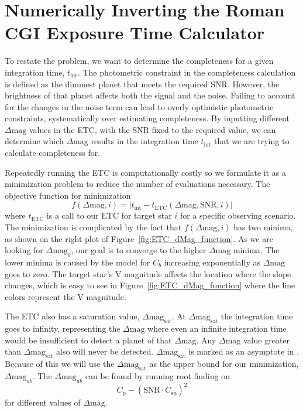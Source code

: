 \section{Numerically Inverting the Roman CGI Exposure Time Calculator}
\label{sec:numerically_inverting_ETC}

To restate the problem, we want to determine the completeness for a given
integration time, $t_{\textrm{int}}$. The photometric constraint in the
completeness calculation is defined as the dimmest planet that meets the
required SNR. However, the brightness of that planet affects both the signal
and the noise. Failing to account for the changes in the noise term can lead to
overly optimistic photometric constraints, systematically over estimating
completeness. By inputting different $\Delta\textrm{mag}$ values in the
ETC, with the SNR fixed to the required value, we can
determine which $\Delta\textrm{mag}$ results in the integration time
$t_{\textrm{int}}$ that we are trying to calculate completeness for.

Repeatedly running the ETC is computationally costly so we formulate it as a
minimization problem to reduce the number of evaluations necessary. The
objective function for minimization
\begin{equation}
  f(\Delta\textrm{mag}, i) = |t_{\textrm{int}} -
  t_{\textrm{ETC}}(\Delta\textrm{mag}, \textrm{SNR}, i)|
  \label{eq:intTime_root_obj}
\end{equation}
where $t_{\textrm{ETC}}$ is a call to our ETC for target star $i$ for a
specific observing scenario. The minimization is complicated by the fact that
$f\left(\Delta\textrm{mag}, i\right)$ has two minima, as shown on the right plot of
Figure~\ref{fig:ETC_dMag_function}. As we are looking for
$\Delta\textrm{mag}_0$, our goal is to converge to the higher
$\Delta\textrm{mag}$ minima. The lower minima is caused by the model for $C_b$
increasing exponentially as $\Delta\textrm{mag}$ goes to zero. The target
star's V magnitude affects the location where the slope changes, which is easy
to see in Figure~\ref{fig:ETC_dMag_function} where the line colors represent
the V magnitude.

The ETC also has a saturation value, $\Delta\textrm{mag}_\textrm{sat}$. At
$\Delta\textrm{mag}_\textrm{sat}$ the integration time goes to infinity,
representing the $\Delta\textrm{mag}$ where even an infinite integration time
would be insufficient to detect a planet of that $\Delta\textrm{mag}$. Any
$\Delta\textrm{mag}$ value greater than $\Delta\textrm{mag}_\textrm{sat}$ also
will never be detected. $\Delta\textrm{mag}_\textrm{sat}$ is marked as an
asymptote in . Because of this we will use the
$\Delta\textrm{mag}_\textrm{sat}$ as the upper bound for our minimization,
$\Delta\textrm{mag}_{ub}$. The $\Delta\textrm{mag}_{ub}$ can be found by
running root finding on 
\begin{equation}
  C_{\textrm{p}} - \left(\textrm{SNR} \cdot C_{\textrm{sp}}\right)^2
  \label{eq:sat_root}
\end{equation}
for different values of $\Delta\textrm{mag}$.

